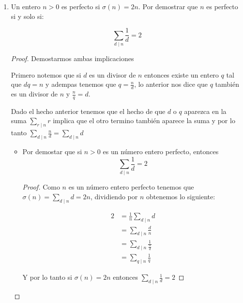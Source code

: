 \documentclass[12pt]{article}
\begin{document}
    \begin{enumerate}
        \item Un entero $n > 0$ es perfecto si $\sigma(n) = 2n$. Por demostrar que $n$ es perfecto si y solo si:
        
            \begin{equation}
                \sum_{d \mid n} \frac{1}{d} = 2
            \end{equation}
        
        
        \begin{proof}
        Demostarmos ambas implicaciones
        
        Primero notemos que si $d$ es un divisor de $n$ entonces existe un entero $q$ tal que $dq = n$ y adempas tenemos que $q = \frac{n}{d}$, lo anterior nos dice que $q$ también es un divisor de $n$ y $\frac{n}{q} = d$.
        
        Dado el hecho anterior tenemos que el hecho de que $d$ o $q$ aparezca en la suma $\sum_{r \mid n} r$ implica que el otro termino también aparece la suma y por lo tanto $\sum_{d \mid n} \frac{n}{d} = \sum_{d \mid n} d$
        
        \begin{itemize}
            \item Por demostar que si $n > 0$ es un número entero perfecto, entonces $$\sum_{d \mid n} \frac{1}{d} = 2$$
            \begin{proof}
            
            Como $n$ es un número entero perfecto tenemos que $\sigma(n) = \sum_{d \mid n} d = 2n$, dividiendo por $n$ obtenemos lo siguiente:
            
                \begin{align*}
                    2 &= \frac{1}{n}\sum_{d \mid n} d \\
                      &= \sum_{d \mid n} \frac{d}{n} \\
                      &=  \sum_{d \mid n} \frac{1}{\frac{n}{d}} \\
                      &=   \sum_{q \mid n} \frac{1}{q}
                \end{align*}
                
            Y por lo tanto si $\sigma(n) = 2n$ entonces $\sum_{d \mid n} \frac{1}{d} = 2$
            
            \end{proof}
            
            
            

\end{itemize}
\end{proof}
\end{enumerate}
\end{document}
